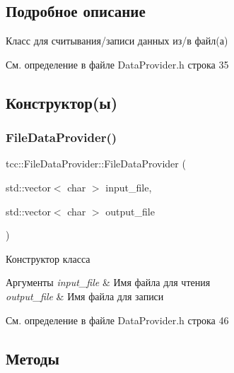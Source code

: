 \subsection{Подробное описание}
Класс для считывания/записи данных из/в файл(а) 

См. определение в файле Data\+Provider.\+h строка 35



\subsection{Конструктор(ы)}
\mbox{\label{classtcc_1_1_file_data_provider_a86089a313a91640e85c4eb6e221ec357}} 
\subsubsection{\texorpdfstring{File\+Data\+Provider()}{FileDataProvider()}}
{\footnotesize\ttfamily tcc\+::\+File\+Data\+Provider\+::\+File\+Data\+Provider (\begin{DoxyParamCaption}\item[{std\+::vector$<$ char $>$}]{input\+\_\+file,  }\item[{std\+::vector$<$ char $>$}]{output\+\_\+file }\end{DoxyParamCaption})\hspace{0.3cm}{\ttfamily [inline]}}



Конструктор класса 


\begin{DoxyParams}{Аргументы}
{\em input\+\_\+file} & Имя файла для чтения \\
\hline
{\em output\+\_\+file} & Имя файла для записи \\
\hline
\end{DoxyParams}


См. определение в файле Data\+Provider.\+h строка 46



\subsection{Методы}
\mbox{\label{classtcc_1_1_file_data_provider_ada1c8160929d1b3a2de366bda89ec0b8}} 
